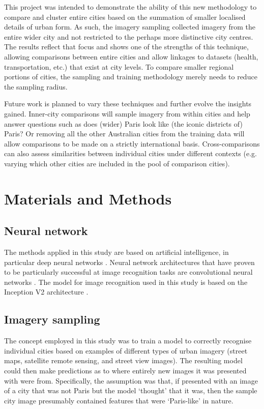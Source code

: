 \documentclass[urbansci,article,submit,moreauthors,pdftex]{Definitions/mdpi}
\begin{document}
This project was intended to demonstrate the ability of this new methodology to compare and cluster entire cities based on the summation of smaller localised details of urban form. As such, the imagery sampling collected imagery from the entire wider city and not restricted to the perhaps more distinctive city centres. The results reflect that focus and shows one of the strengths of this technique, allowing comparisons between entire cities and allow linkages to datasets (health, transportation, etc.) that exist at city levels. To compare smaller regional portions of cities, the sampling and training methodology merely needs to reduce the sampling radius.

Future work is planned to vary these techniques and further evolve the insights gained. Inner-city comparisons will sample imagery from within cities and help answer questions such as does (wider) Paris look like (the iconic districts of) Paris? Or removing all the other Australian cities from the training data will allow comparisons to be made on a strictly international basis. Cross-comparisons can also assess similarities between individual cities under different contexts (e.g. varying which other cities are included in the pool of comparison cities).

\section{Materials and Methods}\label{sec:methods}
\subsection{Neural network}\label{sec:methods1}

The methods applied in this study are based on artificial intelligence, in particular deep neural networks \citep{Bishop1995,Samarasinghe2016,Graupe2013}. Neural network architectures that have proven to be particularly successful at image recognition tasks are convolutional neural networks \citep{Schmidhuber2015}. The model for image recognition used in this study is based on the Inception V2 architecture \citep{Szegedy2015,Ioffe2015}. 

\subsection{Imagery sampling}\label{sec:methods2}

The concept employed in this study was to train a model to correctly recognise individual cities based on examples of different types of urban imagery (street maps, satellite remote sensing, and street view images). The resulting model could then make predictions as to where entirely new images it was presented with were from. Specifically, the assumption was that, if presented with an image of a city that was not Paris but the model `thought' that it was, then the sample city image presumably contained features that were `Paris-like' in nature. 
\end{document}
